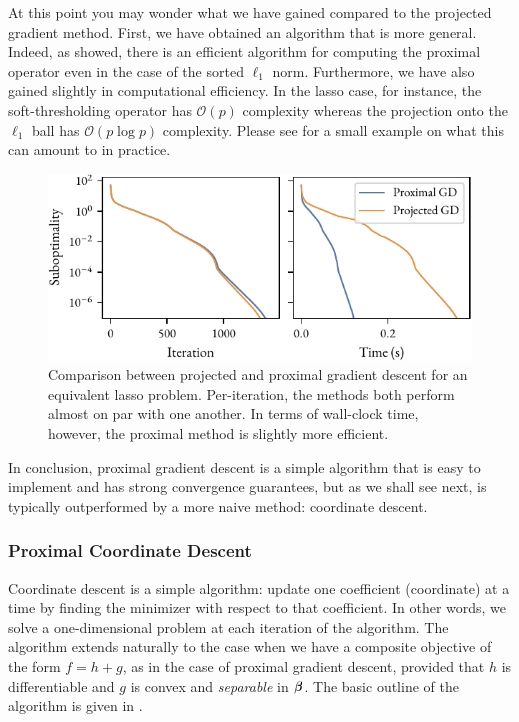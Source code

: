 At this point you may wonder what we have gained compared to the projected gradient method. First, we have obtained an algorithm that is more general. Indeed, as \textcite{bogdan2015} showed, there is an efficient algorithm for computing the proximal operator even in the case of the sorted \(\ell_1\) norm. Furthermore, we have also gained slightly in computational efficiency. In the lasso case, for instance, the soft-thresholding operator has \(\mathcal{O}(p)\) complexity whereas the projection onto the \(\ell_1\) ball has \(\mathcal{O}(p\log p)\) complexity. Please see  for a small example on what this can amount to in practice.

\begin{figure}[htpb]
  \centering
  \includegraphics[]{figures/lasso-projgrad-comp.pdf}
  \caption{%
    Comparison between projected and proximal gradient descent for an equivalent lasso problem.
    Per-iteration, the methods both perform almost on par with one another. In terms of wall-clock time, however, the proximal method is slightly more efficient.
  }
  \label{fig:lasso-projgrad-comp}
\end{figure}

In conclusion, proximal gradient descent is a simple algorithm that is easy to implement and has strong convergence guarantees, but as we shall see next, is typically outperformed by a more naive method: coordinate descent.

\subsubsection{Proximal Coordinate Descent}

Coordinate descent is a simple algorithm: update one coefficient (coordinate) at a time by finding the minimizer with respect to that coefficient. In other words, we solve a one-dimensional problem at each iteration of the algorithm. The algorithm extends naturally to the case when we have a composite objective of the form \(f = h + g\), as in the case of proximal gradient descent, provided that \(h\) is differentiable and \(g\) is convex and \emph{separable} in \(\boldsymbol{\beta}\). The basic outline of the algorithm is given in .

